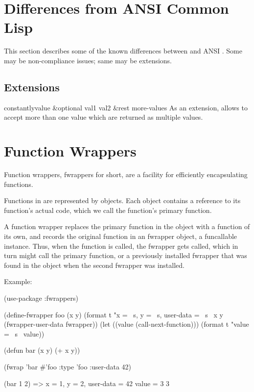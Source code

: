 \section{Differences from ANSI Common Lisp}
This section describes some of the known differences between \cmucl{}
and ANSI \clisp{}.  Some may be non-compliance issues; same may be
extensions.

\subsection{Extensions}

\begin{defun}{}{constantly}{value \&optional val1 val2 \&rest
    more-values}
  As an extension, \cmucl{} allows  to accept more
  than one value which are returned as multiple values.
\end{defun}




\section{Function Wrappers}

Function wrappers, fwrappers for short, are a facility for efficiently
encapsulating functions.

Functions in \cmucl{} are represented by 
objects.  Each  object contains a reference to its
function's actual code, which we call the function's primary function.

A function wrapper replaces the primary function in the 
object with a function of its own, and records the original function
in an fwrapper object, a funcallable instance.  Thus, when the
function is called, the fwrapper gets called, which in turn might call
the primary function, or a previously installed fwrapper that was
found in the  object when the second fwrapper was
installed.

Example:

\begin{lisp}
(use-package :fwrappers)

(define-fwrapper foo (x y)
  (format t "x = ~s, y = ~s, user-data = ~s~%
          x y (fwrapper-user-data fwrapper))
  (let ((value (call-next-function)))
    (format t "value = ~s~%
    value))

(defun bar (x y)
  (+ x y))

(fwrap 'bar #'foo :type 'foo :user-data 42)

(bar 1 2)
 =>
 x = 1, y = 2, user-data = 42
 value = 3
 3   
\end{lisp}

